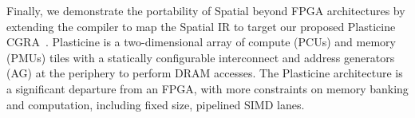 \begin{table}
\centering
\caption{Plasticine DRAM bandwidth, resource utilization, runtime, and speedup ($\times$) over VU9P FPGA. \vspace{-5pt} }
\label{table:plasticine_eval}

\centering
\fontsize{7}{7}\selectfont
{}
\vspace{-10pt}
\end{table}


Finally, we demonstrate the portability of Spatial beyond
FPGA architectures by extending the compiler to map
the Spatial IR to target our proposed Plasticine CGRA~\cite{plasticine}. Plasticine is a
two-dimensional array of compute (PCUs) and memory
(PMUs) tiles with a statically configurable interconnect
and address generators (AG) at the periphery to perform
DRAM accesses. The Plasticine architecture is a significant departure
from an FPGA, with more constraints on memory banking and computation, including
fixed size, pipelined SIMD lanes.

